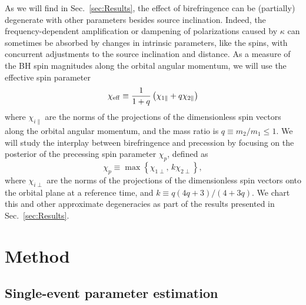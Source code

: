 \documentclass[aps,prd,twocolumn,superscriptaddress,preprintnumbers,floatfix,nofootinbib]{revtex4-2}
\begin{document}
As we will find in Sec.~\ref{sec:Results}, the effect of birefringence can be (partially) degenerate with other parameters besides source inclination.
Indeed, the frequency-dependent amplification or dampening of polarizations caused by $\kappa$ can sometimes be absorbed by changes in intrinsic parameters, like the spins, with concurrent adjustments to the source inclination and distance.
As a measure of the \ac{BH} spin magnitudes along the orbital angular momentum, we will use the effective spin parameter \cite{Damour:2001tu,Ajith:2009bn,Santamaria:2010yb}
\begin{equation}
\chi_{\rm eff} \equiv \frac{1}{1+q} \left(\chi_{1\parallel} + q\chi_{2\parallel}\right)
\end{equation}
where $\chi_{i\parallel}$ are the norms of the projections of the dimensionless spin vectors along the orbital angular momentum, and the  mass ratio is $q \equiv m_2/m_1 \leq 1$.
We will study the interplay between birefringence and precession by focusing on the posterior of the precessing spin parameter $\chi_p$, defined as \cite{Schmidt:2014iyl}
\begin{equation}
\chi_p \equiv \max\left\{ \chi_{1\perp},\, k \chi_{2\perp}\right\} ,
\end{equation}
where $\chi_{i\perp}$ are the norms of the projections of the dimensionless spin vectors onto the orbital plane at a reference time, and $k \equiv q\left(4 q +3\right) / \left(4 + 3q\right)$.
We chart this and other approximate degeneracies as part of the results presented in Sec.~\ref{sec:Results}.


\section{Method}
\label{sec:Method}

\subsection{Single-event parameter estimation}
\end{document}
